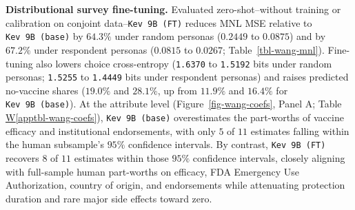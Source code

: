 \documentclass[
  11pt,
  letterpaper,
]{article}
\newcommand*\quartoapptblref[1]{Table \hyperref[#1]{W\ref{#1}}}
\begin{document}
\textbf{Distributional survey fine-tuning.} Evaluated zero-shot--without
training or calibration on conjoint data--\texttt{Kev\ 9B\ (FT)} reduces
MNL MSE relative to \texttt{Kev\ 9B\ (base)} by \(64.3\%\) under random
personas (\(0.2449\) to \(0.0875\)) and by \(67.2\%\) under respondent
personas (\(0.0815\) to \(0.0267\); Table~\ref{tbl-wang-mnl}).
Fine-tuning also lowers choice cross-entropy (\texttt{1.6370} to
\texttt{1.5192} bits under random personas; \texttt{1.5255} to
\texttt{1.4449} bits under respondent personas) and raises predicted
no-vaccine shares (\(19.0\%\) and \(28.1\%\), up from \(11.9\%\) and
\(16.4\%\) for \texttt{Kev\ 9B\ (base)}). At the attribute level
(Figure~\ref{fig-wang-coefs}, Panel A;
\quartoapptblref{apptbl-wang-coefs}), \texttt{Kev\ 9B\ (base)}
overestimates the part-worths of vaccine efficacy and institutional
endorsements, with only \(5\) of \(11\) estimates falling within the
human subsample's \(95\%\) confidence intervals. By contrast,
\texttt{Kev\ 9B\ (FT)} recovers \(8\) of \(11\) estimates within those
\(95\%\) confidence intervals, closely aligning with full-sample human
part-worths on efficacy, FDA Emergency Use Authorization, country of
origin, and endorsements while attenuating protection duration and rare
major side effects toward zero.
\end{document}
